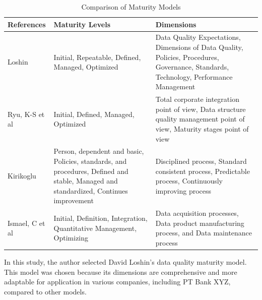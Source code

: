 \documentclass[conference]{IEEEtran}
\begin{document}
\begin{table}[H]
\caption{Comparison of Maturity Models}
\label{tab:comparison-dqm-part1}
\centering
\begin{tabular}{|p{1.5cm}|p{3cm}|p{3cm}|}
\hline
\textbf{References} & \textbf{Maturity Levels} & \textbf{Dimensions} \\ \hline
Loshin \cite{loshin_dqi} & Initial, Repeatable, Defined, Managed, Optimized & Data Quality Expectations, Dimensions of Data Quality, Policies, Procedures, Governance, Standards, Technology, Performance Management \\ \hline
Ryu, K-S et al \cite{ryu2006dqm} & Initial, Defined, Managed, Optimized & Total corporate integration point of view, Data structure quality management point of view, Maturity stages point of view \\ \hline
Kirikoglu \cite{kirikoglu2017dqm} & Person, dependent and basic, Policies, standards, and procedures, Defined and stable, Managed and standardized, Continues improvement & Disciplined process, Standard consistent process, Predictable process, Continuously improving process \\ \hline
Ismael, C et al \cite{ismael2003caldea} & Initial, Definition, Integration, Quantitative Management, Optimizing & Data acquisition processes, Data product manufacturing process, and Data maintenance process \\ \hline
\end{tabular}
\end{table}



In this study, the author selected David Loshin's data quality maturity model. This model was chosen because its dimensions are comprehensive and more adaptable for application in various companies, including PT Bank XYZ, compared to other models.

\end{document}

